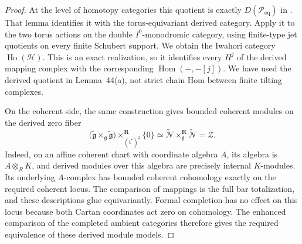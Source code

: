 \documentclass[11pt]{article}
\numberwithin{equation}{section}
\theoremstyle{definition}
\theoremstyle{remark}
\newcommand{\g}{\mathfrak g}
\newcommand{\cN}{\mathcal N}
\newcommand{\Hom}{\operatorname{Hom}}
\begin{document}
\begin{proof}
At the level of homotopy categories this quotient is exactly
$D(\mathcal P_{\mathrm{eq}})$ in
\cite[Section~9.3.1, Lemma~44(a)]{Enh:Bezrukavnikov}.
That lemma identifies it with the torus-equivariant derived
category.  Apply it to the two torus actions on the double
$I^0$-monodromic category, using finite-type jet quotients on every
finite Schubert support.  We obtain the Iwahori category
$\operatorname{Ho}(\mathscr H)$.  This is an exact realization, so
it identifies every $H^j$ of the derived mapping complex with the corresponding
$\Hom(-,-[j])$.  We have used the derived quotient in Lemma~44(a),
not strict chain Hom between finite tilting complexes.

On the coherent side, the same construction gives bounded coherent
modules on the derived zero fiber
\[
 \bigl(\widetilde{\g}\times_{\g}\widetilde{\g}\bigr)
  \mathbin{\times}^{\mathbf R}_{(\mathfrak t^*)^2}\{0\}
 \simeq
 \widetilde{\cN}\mathbin{\times}^{\mathbf R}_{\g}
 \widetilde{\cN}=\mathcal Z.
\]
Indeed, on an affine coherent chart with coordinate algebra $A$, its
algebra is $A\otimes_R K$, and derived modules over this algebra are
precisely internal $K$-modules.  Its underlying $A$-complex has
bounded coherent cohomology exactly on the required coherent locus.
The comparison of mappings is the full bar totalization, and these
descriptions glue equivariantly.  Formal completion has no effect
on this locus because both Cartan coordinates act zero on cohomology.
The enhanced comparison of the completed ambient categories therefore
gives the required equivalence of these derived module models.


\end{proof}
\end{document}

